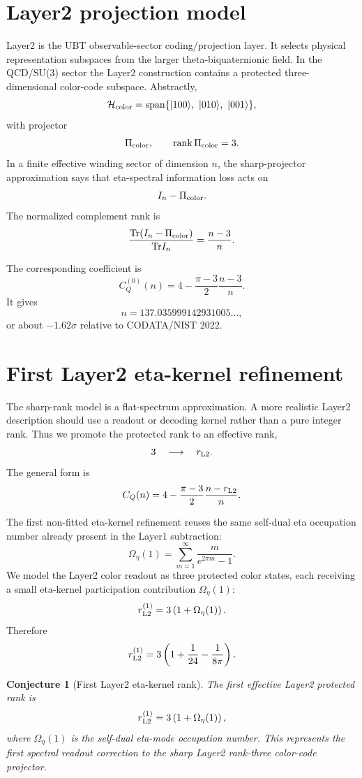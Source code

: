 \documentclass[12pt,a4paper]{article}
\newtheorem{conjecture}[definition]{Conjecture}
\begin{document}
\section{Layer2 projection model}

Layer2 is the UBT observable-sector coding/projection layer.  It selects
physical representation subspaces from the larger theta-biquaternionic field.
In the QCD/SU(3) sector the Layer2 construction contains a protected
three-dimensional color-code subspace.  Abstractly,
\[
  \mathcal H_{\rm color}
  =
  \mathrm{span}\{|100\rangle,\ |010\rangle,\ |001\rangle\},
\]
with projector
\[
  \Pi_{\rm color},
  \qquad
  \mathrm{rank}\,\Pi_{\rm color}=3.
\]
In a finite effective winding sector of dimension $n$, the sharp-projector
approximation says that eta-spectral information loss acts on
\[
  I_n-\Pi_{\rm color}.
\]
The normalized complement rank is
\[
  \frac{\mathrm{Tr}(I_n-\Pi_{\rm color})}{\mathrm{Tr}I_n}
  =
  \frac{n-3}{n}.
\]

The corresponding coefficient is
\[
  C_Q^{(0)}(n)
  =
  4-\frac{\pi-3}{2}\frac{n-3}{n}.
\]
It gives
\[
  n=137.035999142931005\ldots ,
\]
or about $-1.62\sigma$ relative to CODATA/NIST 2022.

\section{First Layer2 eta-kernel refinement}

The sharp-rank model is a flat-spectrum approximation.  A more realistic
Layer2 description should use a readout or decoding kernel rather than a pure
integer rank.  Thus we promote the protected rank to an effective rank,
\[
  3\quad\longrightarrow\quad r_{\rm L2}.
\]
The general form is
\[
  C_Q(n)
  =
  4-\frac{\pi-3}{2}\frac{n-r_{\rm L2}}{n}.
\]

The first non-fitted eta-kernel refinement reuses the same self-dual eta
occupation number already present in the Layer1 subtraction:
\[
  \Omega_\eta(1)
  =
  \sum_{m=1}^{\infty}
  \frac{m}{e^{2\pi m}-1}.
\]
We model the Layer2 color readout as three protected color states, each
receiving a small eta-kernel participation contribution $\Omega_\eta(1)$:
\[
  r_{\rm L2}^{(1)}
  =
  3\left(1+\Omega_\eta(1)\right).
\]
Therefore
\[
  r_{\rm L2}^{(1)}
  =
  3\left(1+\frac{1}{24}-\frac{1}{8\pi}\right).
\]

\begin{conjecture}[First Layer2 eta-kernel rank]
The first effective Layer2 protected rank is
\[
  r_{\rm L2}^{(1)}
  =
  3\left(1+\Omega_\eta(1)\right),
\]
where $\Omega_\eta(1)$ is the self-dual eta-mode occupation number.  This
represents the first spectral readout correction to the sharp Layer2
rank-three color-code projector.
\end{conjecture}
\end{document}
